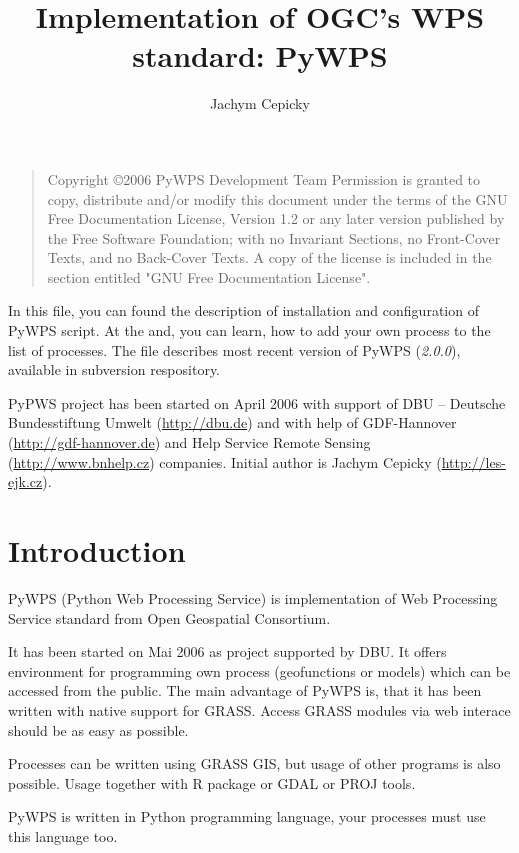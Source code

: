 \documentclass[a4paper,11pt]{article}
\author{Jachym Cepicky}
\title{Implementation of OGC's WPS standard: PyWPS}
\newcommand{\version}{\emph{2.0.0}}
\begin{document}
\maketitle{}

\bigskip
\begin{quote}
    Copyright \copyright  2006 PyWPS Development Team
    Permission is granted to copy, distribute and/or modify this document
    under the terms of the GNU Free Documentation License, Version 1.2
    or any later version published by the Free Software Foundation;
    with no Invariant Sections, no Front-Cover Texts, and no Back-Cover Texts.
    A copy of the license is included in the section entitled "GNU
    Free Documentation License".
\end{quote}
\bigskip


In this file, you can found the description of installation and
configuration of PyWPS script. At the and, you can learn, how to add
your own process to the list of processes. The file describes most recent
version of PyWPS (\version), available in subversion respository.

PyPWS project has been started on April 2006 with support of DBU --
Deutsche Bundesstiftung Umwelt (\url{http://dbu.de}) and with help of
GDF-Hannover (\url{http://gdf-hannover.de}) and Help Service Remote
Sensing (\url{http://www.bnhelp.cz}) companies. Initial author is Jachym
Cepicky (\url{http://les-ejk.cz}).
    

    \tableofcontents

\newpage

\section{Introduction}
PyWPS (Python Web Processing Service) is implementation of Web
Processing Service standard from Open Geospatial Consortium.

It has been started on Mai 2006 as project supported by DBU. It offers
environment for programming own process (geofunctions or models) which can
be accessed from the public. The main advantage of PyWPS is, that it has
been written with native support for GRASS. Access GRASS modules via web
interace should be as easy as possible.

Processes can be written using GRASS GIS, but usage of other programs is
also possible. Usage together with R package or GDAL or PROJ tools.

PyWPS is written in Python programming language, your processes must use
this language too. 
\end{document}
